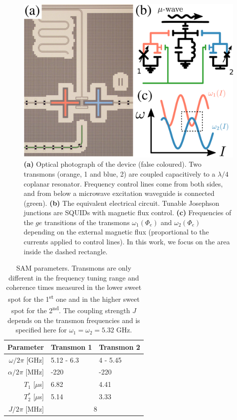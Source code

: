 \documentclass[%
 prx,
 amsmath,amssymb,
 reprint,%
]{revtex4-1}
\begin{document}
\begin{figure}
	 	\includegraphics[width=\linewidth]{experiment_2}
	\caption{\textbf{(a)} Optical photograph of the device (false coloured). Two transmons (orange, 1 and blue, 2) are coupled capacitively to a $\lambda/4$ coplanar resonator. Frequency control lines come from both sides, and from below a microwave excitation waveguide is connected (green). \textbf{(b)} The equivalent electrical circuit. Tunable Josephson junctions are SQUIDs with magnetic flux control. \textbf{(c)} Frequencies of the $ge$ transitions of the transmons $\omega_1(\Phi_e)$ and $\omega_2(\Phi_e)$ depending on the external magnetic flux (proportional to the currents applied to control lines). In this work, we focus on the area inside the dashed rectangle.}
	\label{fig:experiment}
\end{figure}


\begin{table}
	\begin{ruledtabular}
	\begin{tabular}{rll}
	Parameter & Transmon 1  & Transmon 2\\\hline
	$\omega/2\pi$ [GHz] & 5.12 - 6.3  & 4 - 5.45\\
	$\alpha/2\pi$ [MHz] & -220 & -220 \\
	$T_1$ [$\mu$s]  & 6.82 &  4.41 \\
	$T_2^*$ [$\mu$s]  & 5.14  &  3.33\\\hline
	$J/2\pi$ [MHz] &\multicolumn{2}{c}{8} 
	\end{tabular}
	\end{ruledtabular}
	\caption{SAM parameters. Transmons are only different in the frequency tuning range and coherence times measured in the lower sweet spot for the 1\textsuperscript{st} one and in the higher sweet spot for the 2\textsuperscript{nd}. The coupling strength $J$ depends on the transmon frequencies and is specified here for $\omega_1 = \omega_2 = 5.32$ GHz.}
	\label{tab:parameters}
\end{table}
\end{document}
